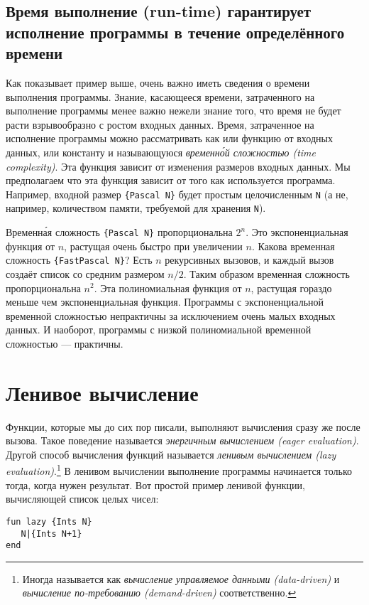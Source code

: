 \subsection{Время выполнение (run-time) гарантирует исполнение программы в течение определённого времени}

Как показывает пример выше, очень важно иметь сведения о времени выполнения программы. Знание, касающееся времени, затраченного на выполнение программы менее важно нежели знание того, что время не будет расти взрывообразно с ростом входных данных. Время, затраченное на исполнение программы можно рассматривать как или функцию от входных данных, или константу и называющуюся \emph{временн\'{о}й сложностью (time complexity)}. Эта функция зависит от изменения размеров входных данных. Мы предполагаем что эта функция зависит от того как используется программа. Например, входной размер \lstinline|{Pascal N}| будет простым целочисленным \lstinline|N| (а не, например, количеством памяти, требуемой для хранения \lstinline|N|).

Временн\'{а}я сложность \lstinline|{Pascal N}| пропорциональна $2^n$. Это экспоненциальная функция от $n$, растущая очень быстро при увеличении $n$. Какова временная сложность \lstinline|{FastPascal N}|? Есть $n$ рекурсивных вызовов, и каждый вызов создаёт список со средним размером $n/2$. Таким образом временная сложность пропорциональна $n^2$. Эта полиномиальная функция от $n$, растущая гораздо меньше чем экспоненциальная функция. Программы с экспоненциальной временной сложностью непрактичны за исключением очень малых входных данных. И наоборот, программы с низкой полиномиальной временной сложностью --- практичны.

\section{Ленивое вычисление}

Функции, которые мы до сих пор писали, выполняют вычисления сразу же после вызова. Такое поведение называется \emph{энергичным вычислением (eager evaluation)}. Другой способ вычисления функций называется \emph{ленивым вычислением (lazy evaluation)}.\footnote{Иногда называется как \emph{вычисление управляемое данными (data-driven)} и \emph{вычисление по-требованию (demand-driven)} соответственно.} В ленивом вычислении выполнение программы начинается только тогда, когда нужен результат. Вот простой пример ленивой функции, вычисляющей список целых чисел:

\begin{lstlisting}
fun lazy {Ints N}
   N|{Ints N+1}
end
\end{lstlisting}


